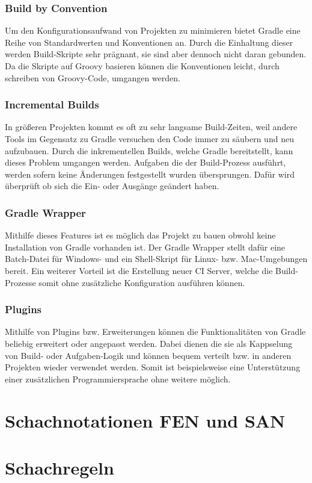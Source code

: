 \subsubsection{Build by Convention}
Um den Konfigurationsaufwand von Projekten zu minimieren bietet Gradle eine Reihe von Standardwerten und Konventionen an. Durch die Einhaltung dieser werden Build-Skripte sehr prägnant, sie sind aber dennoch nicht daran gebunden. Da die Skripte auf Groovy basieren können die Konventionen leicht, durch schreiben von Groovy-Code, umgangen werden.

\subsubsection{Incremental Builds}
In größeren Projekten kommt es oft zu sehr langsame Build-Zeiten, weil andere Tools im Gegensatz zu Gradle versuchen den Code immer zu säubern und neu aufzubauen. Durch die inkrementellen Builds, welche Gradle bereitstellt, kann dieses Problem umgangen werden. Aufgaben die der Build-Prozess ausführt, werden sofern keine Änderungen festgestellt wurden übersprungen. Dafür wird überprüft ob sich die Ein- oder Ausgänge geändert haben.

\subsubsection{Gradle Wrapper}
Mithilfe dieses Features ist es möglich das Projekt zu bauen obwohl keine Installation von Gradle vorhanden ist. Der Gradle Wrapper stellt dafür eine Batch-Datei für Windows- und ein Shell-Skript für Linux- bzw. Mac-Umgebungen bereit. Ein weiterer Vorteil ist die Erstellung neuer \gls{CI} Server, welche die Build-Prozesse somit ohne zusätzliche Konfiguration ausführen können.

\subsubsection{Plugins}
Mithilfe von Plugins bzw. Erweiterungen können die Funktionalitäten von Gradle beliebig erweitert oder angepasst werden. Dabei dienen die sie als Kappselung von Build- oder Aufgaben-Logik und können bequem verteilt bzw. in anderen Projekten wieder verwendet werden. Somit ist beispielsweise eine Unterstützung einer zusätzlichen Programmiersprache ohne weitere möglich.

\section{Schachnotationen FEN und SAN}

\section{Schachregeln}
